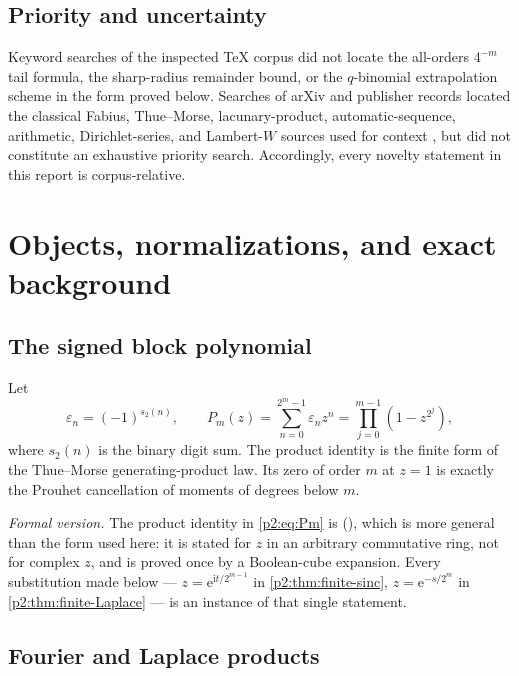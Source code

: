 \documentclass[11pt,oneside]{article}
\numberwithin{equation}{section}
\theoremstyle{definition}
\theoremstyle{remark}
\newcommand{\e}{\mathrm e}
\newcommand{\ii}{\mathrm i}
\newcommand{\eps}{\varepsilon}
\begin{document}
\subsection{Priority and uncertainty}

Keyword searches of the inspected TeX corpus did not locate the all-orders $4^{-m}$ tail
formula, the sharp-radius remainder bound, or the $q$-binomial extrapolation scheme in the
form proved below.  Searches of arXiv and publisher records located the classical Fabius,
Thue--Morse, lacunary-product, automatic-sequence, arithmetic, Dirichlet-series, and
Lambert-$W$ sources used for context \cite{p2:arias1982,p2:arias2017arith,p2:aistleitner2015,p2:toth2022,p2:corless1996,p2:allouche2003}, but did not constitute an exhaustive priority search.  Accordingly, every novelty statement in this report is
corpus-relative.

\section{Objects, normalizations, and exact background}
\label{p2:sec:objects}

\subsection{The signed block polynomial}

Let
\begin{equation}
 \eps_n=(-1)^{s_2(n)},\qquad
 P_m(z)=\sum_{n=0}^{2^m-1}\eps_n z^n
       =\prod_{j=0}^{m-1}\left(1-z^{2^j}\right),
 \label{p2:eq:Pm}
\end{equation}
where $s_2(n)$ is the binary digit sum.  The product identity is the finite form of the
Thue--Morse generating-product law.  Its zero of order $m$ at $z=1$ is exactly the Prouhet
cancellation of moments of degrees below $m$.

\emph{Formal version.}  The product identity in \eqref{p2:eq:Pm} is
 (),
which is more general than the form used here: it is stated for $z$ in an arbitrary
commutative ring, not for complex $z$, and is proved once by a Boolean-cube expansion.  Every
substitution made below --- $z=\e^{\ii t/2^{m-1}}$ in \cref{p2:thm:finite-sinc},
$z=\e^{-s/2^m}$ in \cref{p2:thm:finite-Laplace} --- is an instance of that single statement.

\subsection{Fourier and Laplace products}
\end{document}
